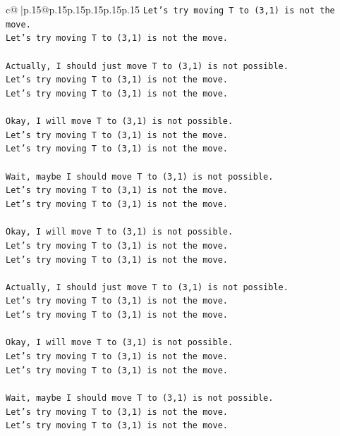 \documentclass{article}
\begin{document}
{\begin{supertabular}{c@{$\;$}|p{.15\linewidth}@{}p{.15\linewidth}p{.15\linewidth}p{.15\linewidth}p{.15\linewidth}p{.15\linewidth}}
{{{\texttt{Let's try moving T to (3,1) is not the move.} \\
\texttt{Let's try moving T to (3,1) is not the move.} \\
\\ 
\texttt{Actually, I should just move T to (3,1) is not possible.} \\
\texttt{Let's try moving T to (3,1) is not the move.} \\
\texttt{Let's try moving T to (3,1) is not the move.} \\
\\ 
\texttt{Okay, I will move T to (3,1) is not possible.} \\
\texttt{Let's try moving T to (3,1) is not the move.} \\
\texttt{Let's try moving T to (3,1) is not the move.} \\
\\ 
\texttt{Wait, maybe I should move T to (3,1) is not possible.} \\
\texttt{Let's try moving T to (3,1) is not the move.} \\
\texttt{Let's try moving T to (3,1) is not the move.} \\
\\ 
\texttt{Okay, I will move T to (3,1) is not possible.} \\
\texttt{Let's try moving T to (3,1) is not the move.} \\
\texttt{Let's try moving T to (3,1) is not the move.} \\
\\ 
\texttt{Actually, I should just move T to (3,1) is not possible.} \\
\texttt{Let's try moving T to (3,1) is not the move.} \\
\texttt{Let's try moving T to (3,1) is not the move.} \\
\\ 
\texttt{Okay, I will move T to (3,1) is not possible.} \\
\texttt{Let's try moving T to (3,1) is not the move.} \\
\texttt{Let's try moving T to (3,1) is not the move.} \\
\\ 
\texttt{Wait, maybe I should move T to (3,1) is not possible.} \\
\texttt{Let's try moving T to (3,1) is not the move.} \\
\texttt{Let's try moving T to (3,1) is not the move.} \\
\\ 
}}}
\end{supertabular}}
\end{document}
